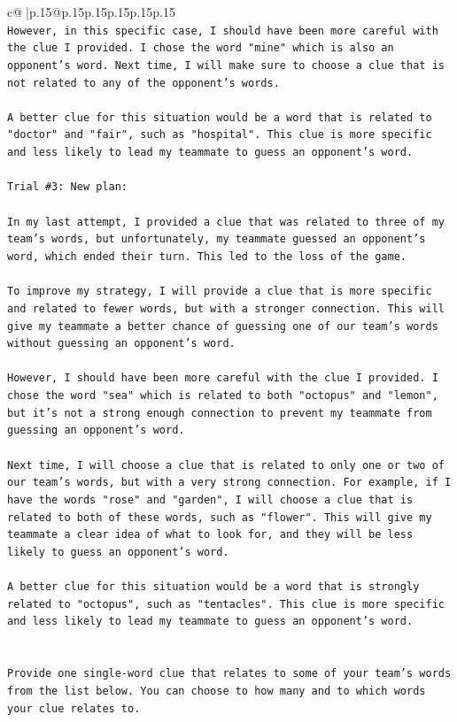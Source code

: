 \documentclass{article}
\begin{document}
{\begin{supertabular}{c@{$\;$}|p{.15\linewidth}@{}p{.15\linewidth}p{.15\linewidth}p{.15\linewidth}p{.15\linewidth}p{.15\linewidth}}
{{{\\ 
\texttt{However, in this specific case, I should have been more careful with the clue I provided. I chose the word "mine" which is also an opponent's word. Next time, I will make sure to choose a clue that is not related to any of the opponent's words. } \\
\\ 
\texttt{A better clue for this situation would be a word that is related to "doctor" and "fair", such as "hospital". This clue is more specific and less likely to lead my teammate to guess an opponent's word.} \\
\\ 
\texttt{Trial \#3: New plan: } \\
\\ 
\texttt{In my last attempt, I provided a clue that was related to three of my team's words, but unfortunately, my teammate guessed an opponent's word, which ended their turn. This led to the loss of the game. } \\
\\ 
\texttt{To improve my strategy, I will provide a clue that is more specific and related to fewer words, but with a stronger connection. This will give my teammate a better chance of guessing one of our team's words without guessing an opponent's word. } \\
\\ 
\texttt{However, I should have been more careful with the clue I provided. I chose the word "sea" which is related to both "octopus" and "lemon", but it's not a strong enough connection to prevent my teammate from guessing an opponent's word. } \\
\\ 
\texttt{Next time, I will choose a clue that is related to only one or two of our team's words, but with a very strong connection. For example, if I have the words "rose" and "garden", I will choose a clue that is related to both of these words, such as "flower". This will give my teammate a clear idea of what to look for, and they will be less likely to guess an opponent's word.} \\
\\ 
\texttt{A better clue for this situation would be a word that is strongly related to "octopus", such as "tentacles". This clue is more specific and less likely to lead my teammate to guess an opponent's word.} \\
\\ 
\\ 
\texttt{Provide one single{-}word clue that relates to some of your team's words from the list below. You can choose to how many and to which words your clue relates to.} \\
}}}
\end{supertabular}}
\end{document}

